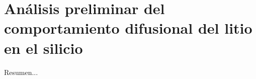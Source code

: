 \chapter{Análisis preliminar del comportamiento difusional del litio en el silicio}\label{ch:comportamiento}
\thispagestyle{empty}

\vspace{50pt}

\begin{adjustwidth}{50pt}{50pt}
    Resumen...
\end{adjustwidth}

\clearpage
\newpage
\thispagestyle{empty}
\mbox{}
\newpage




